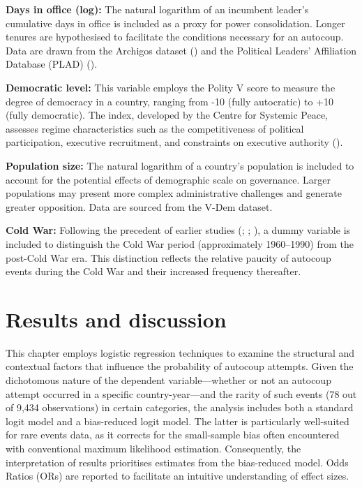 \documentclass[
  12pt,
]{report}
\begin{document}
\textbf{Days in office (log):} The natural logarithm of an incumbent
leader's cumulative days in office is included as a proxy for power
consolidation. Longer tenures are hypothesised to facilitate the
conditions necessary for an autocoup. Data are drawn from the Archigos
dataset () and the Political Leaders' Affiliation Database (PLAD)
().

\textbf{Democratic level:} This variable employs the Polity V score to
measure the degree of democracy in a country, ranging from -10 (fully
autocratic) to +10 (fully democratic). The index, developed by the
Centre for Systemic Peace, assesses regime characteristics such as the
competitiveness of political participation, executive recruitment, and
constraints on executive authority
().

\textbf{Population size:} The natural logarithm of a country's
population is included to account for the potential effects of
demographic scale on governance. Larger populations may present more
complex administrative challenges and generate greater opposition. Data
are sourced from the V-Dem dataset.

\textbf{Cold War:} Following the precedent of earlier studies
(;
;
), a dummy variable is
included to distinguish the Cold War period (approximately 1960--1990)
from the post-Cold War era. This distinction reflects the relative
paucity of autocoup events during the Cold War and their increased
frequency thereafter.

\section{Results and discussion}\label{results-and-discussion}

This chapter employs logistic regression techniques to examine the
structural and contextual factors that influence the probability of
autocoup attempts. Given the dichotomous nature of the dependent
variable---whether or not an autocoup attempt occurred in a specific
country-year---and the rarity of such events (78 out of 9,434
observations) in certain categories, the analysis includes both a
standard logit model and a bias-reduced logit model. The latter is
particularly well-suited for rare events data, as it corrects for the
small-sample bias often encountered with conventional maximum likelihood
estimation. Consequently, the interpretation of results prioritises
estimates from the bias-reduced model. Odds Ratios (ORs) are reported to
facilitate an intuitive understanding of effect sizes.
\end{document}
